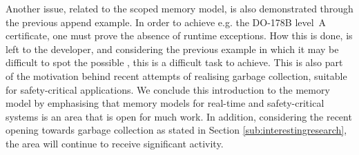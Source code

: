 Another issue, related to the scoped memory model, is also demonstrated through the previous  append example. In order to achieve e.g. the DO-178B level~A certificate, one must prove the absence of runtime exceptions\cite{Schoeberl:2007:GCS:1288940.1288953}. How this is done, is left to the developer, and considering the previous example in which it may be difficult to spot the possible , this is a difficult task to achieve. This is also part of the motivation behind recent attempts of realising garbage collection, suitable for safety-critical applications. We conclude this introduction to the memory model by emphasising that memory models for real-time and safety-critical systems is an area that is open for much work. In addition, considering the recent opening towards garbage collection as stated in Section \ref{sub:interestingresearch}, the area will continue to receive significant activity.
